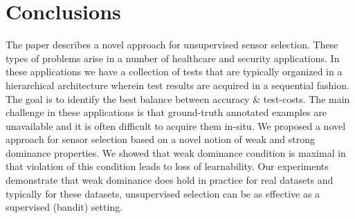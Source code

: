 \documentclass[11pt]{article} %
\newcommand{\ses}{sensor selection\xspace}
\begin{document}
\section{Conclusions}
\label{sec:Conclu}
%
The paper describes a novel approach for unsupervised \ses. These types of problems arise in a number of healthcare and security applications. In these applications we have a collection of tests that are typically organized in a hierarchical architecture wherein test results are acquired in a sequential fashion. The goal is to identify the best balance between accuracy \& test-costs. The main challenge in these applications is that ground-truth annotated examples are unavailable and it is often difficult to acquire them in-situ. We proposed a novel approach for \ses based on a novel notion of weak and strong dominance properties. We showed that weak dominance condition is maximal in that violation of this condition leads to loss of learnability. Our experiments demonstrate that weak dominance does hold in practice for real datasets and typically for these datasets, unsupervised selection can be as effective as a supervised (bandit) setting. 
\end{document}
